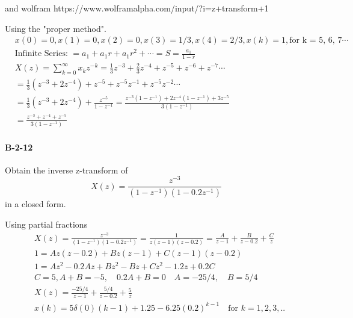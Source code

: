 { and wolfram https://www.wolframalpha.com/input/?i=z+transform+1%

Using the "proper method".
\begin{align*}
& x(0)=0, x(1) = 0, x(2)=0, x(3)=1/3, x(4) = 2/3, x(k) =1, \text{for k = 5, 6, 7} \cdots \\
&\text{Infinite Series: } = a_1+a_1r + a_1r^2 + \cdots = S = \frac{a_1}{1-r} \\
& X(z) = \sum_{k=0}^{\infty} x_k z^{-k} = \frac{1}{3}z^{-3}+\frac{2}{3}z^{-4}+z^{-5}+z^{-6} + z^{-7} \cdots \\ %
& = \frac{1}{3}(z^{-3}+2z^{-4})+z^{-5}+z^{-5}z^{-1} + z^{-5}z^{-2} \cdots \\
& = \frac{1}{3} (z^{-3}+2z^{-4}) + \frac{z^{-5}}{1-z^{-1}}    = \frac{z^{-3}(1-z^{-1})+2z^{-4}(1-z^{-1})+3z^{-5}}{3(1-z^{-1})} \\
& = \frac{z^{-3}+z^{-4}+z^{-5}}{3(1-z^{-1})}
\end{align*}
\paragraph{B-2-12}
Obtain the inverse z-transform of
\[
X(z)=\frac{z^{-3}}{(1-z^{-1})(1-0.2z^{-1})}
\]
in a closed form.

Using partial fractions
\vspace{-0.5cm}
\begin{align*}
& X(z) = \frac{z^{-3}}{(1-z^{-1})(1-0.2z^{-1})}=\frac{1}{z(z-1)(z-0.2)}=\frac{A}{z-1}+\frac{B}{z-0.2}+ \frac{C}{z}\\
& 1 =  Az(z-0.2)+Bz(z-1)+C(z-1)(z-0.2) \\
& 1 = Az^2-0.2Az+Bz^2-Bz+Cz^2-1.2z+0.2C \\
& C = 5, A+B=-5, \quad 0.2A+B=0 \quad A=-25/4, \quad B = 5/4 \\
& X(z) = \frac{-25/4}{z-1}+\frac{5/4}{z-0.2}+\frac{5}{z} \\
& x(k) = 5 \delta(0)(k-1)+1.25-6.25(0.2)^{k-1} \quad \text{for } k =1,2,3, ..
\end{align*}
}
